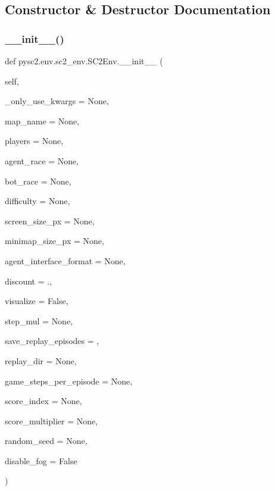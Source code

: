 \subsection{Constructor \& Destructor Documentation}
\mbox{\label{classpysc2_1_1env_1_1sc2__env_1_1_s_c2_env_ac2a49052b728228f1ed327d31ab37fcc}} 
\subsubsection{\texorpdfstring{\+\_\+\+\_\+init\+\_\+\+\_\+()}{\_\_init\_\_()}}
{\footnotesize\ttfamily def pysc2.\+env.\+sc2\+\_\+env.\+S\+C2\+Env.\+\_\+\+\_\+init\+\_\+\+\_\+ (\begin{DoxyParamCaption}\item[{}]{self,  }\item[{}]{\+\_\+only\+\_\+use\+\_\+kwargs = {\ttfamily None},  }\item[{}]{map\+\_\+name = {\ttfamily None},  }\item[{}]{players = {\ttfamily None},  }\item[{}]{agent\+\_\+race = {\ttfamily None},  }\item[{}]{bot\+\_\+race = {\ttfamily None},  }\item[{}]{difficulty = {\ttfamily None},  }\item[{}]{screen\+\_\+size\+\_\+px = {\ttfamily None},  }\item[{}]{minimap\+\_\+size\+\_\+px = {\ttfamily None},  }\item[{}]{agent\+\_\+interface\+\_\+format = {\ttfamily None},  }\item[{}]{discount = {.},  }\item[{}]{visualize = {\ttfamily False},  }\item[{}]{step\+\_\+mul = {\ttfamily None},  }\item[{}]{save\+\_\+replay\+\_\+episodes = {},  }\item[{}]{replay\+\_\+dir = {\ttfamily None},  }\item[{}]{game\+\_\+steps\+\_\+per\+\_\+episode = {\ttfamily None},  }\item[{}]{score\+\_\+index = {\ttfamily None},  }\item[{}]{score\+\_\+multiplier = {\ttfamily None},  }\item[{}]{random\+\_\+seed = {\ttfamily None},  }\item[{}]{disable\+\_\+fog = {\ttfamily False} }\end{DoxyParamCaption})}


